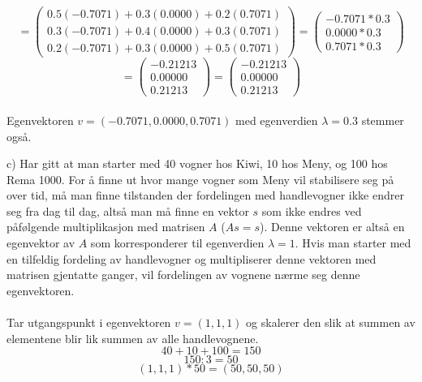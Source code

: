 \begin{equation}\nonumber
= \begin{pmatrix}
0.5(-0.7071)+0.3(0.0000)+0.2(0.7071) \\ 0.3(-0.7071)+0.4(0.0000)+0.3(0.7071) \\ 0.2(-0.7071)+0.3(0.0000)+0.5(0.7071)
\end{pmatrix} = \begin{pmatrix}
     -0.7071*0.3 \\ 0.0000*0.3 \\ 0.7071*0.3
\end{pmatrix}
\end{equation}
\begin{equation}\nonumber
= \begin{pmatrix}
    -0.21213 \\ 0.00000 \\ 0.21213
\end{pmatrix} = \begin{pmatrix}
     -0.21213 \\ 0.00000 \\  0.21213
\end{pmatrix}
\end{equation}
\vspace{0.1in}
\\ Egenvektoren $v=(-0.7071, 0.0000, 0.7071)$ med egenverdien $\lambda = 0.3$ stemmer også.

\newpage
c) Har gitt at man starter med 40 vogner hos Kiwi, 10 hos Meny, og 100 hos Rema 1000. For å finne ut hvor mange vogner som Meny vil stabilisere seg på over tid, må man finne tilstanden der fordelingen med handlevogner ikke endrer seg fra dag til dag, altså man må finne en vektor $s$ som ikke endres ved påfølgende multiplikasjon med matrisen $A$ ($As = s$). Denne vektoren er altså en egenvektor av $A$ som korresponderer til egenverdien $\lambda = 1$. Hvis man starter med en tilfeldig fordeling av handlevogner og multipliserer denne vektoren med matrisen gjentatte ganger, vil fordelingen av vognene nærme seg denne egenvektoren. 
\\
\\ Tar utgangspunkt i egenvektoren $v=(1,1,1)$ og skalerer den slik at summen av elementene blir lik summen av alle handlevognene. 
\\ \begin{equation} \nonumber
    40+10+100 = 150 \end{equation}
    \begin{equation}\nonumber
    150 : 3 = 50 \end{equation}
    \begin{equation}\nonumber(1,1,1)*50 = (50,50,50)\end{equation}

